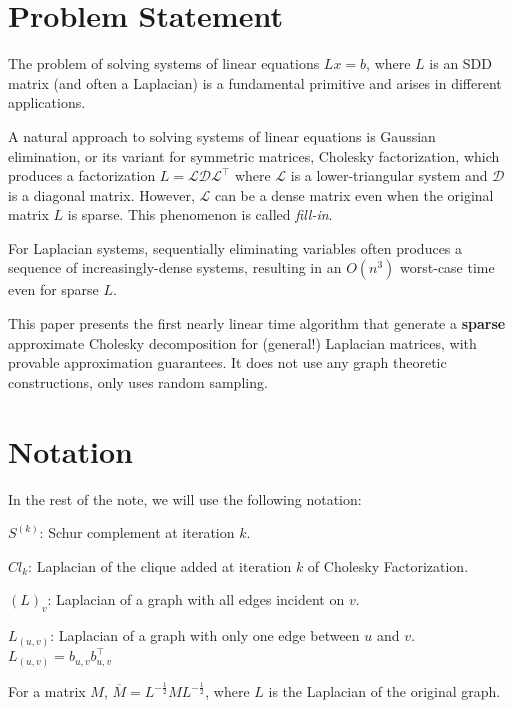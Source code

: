 \documentclass[11pt]{article}
\newenvironment{tight_itemize}{
\begin{itemize}
 \setlength{\itemsep}{2pt}
 \setlength{\parskip}{1pt}
}{\end{itemize}}
\begin{document}
\newcommand{\coursenum}{{CSC 2420}}
\newcommand{\coursename}{Paper Presentation\cite{Kyng16}}
\newcommand{\courseprof}{Sushant Sachdeva}


\section{Problem Statement}

The problem of solving systems of linear equations $Lx = b$, where $L$ is an SDD matrix (and often a Laplacian) is a fundamental primitive 
and arises in different applications. 

A natural approach to solving systems of linear equations is Gaussian elimination, or its variant for symmetric matrices, 
Cholesky factorization, which produces a factorization 
$L = \mathcal{L} \mathcal{D} \mathcal{L}^\top$ where $\mathcal{L}$ is a lower-triangular system 
and $\mathcal{D}$ is a diagonal matrix. However, $\mathcal{L}$ can be a dense matrix even when the original matrix $L$ is sparse. 
This phenomenon is called \textit{fill-in}.

For Laplacian systems, sequentially eliminating variables often produces a sequence of increasingly-dense systems, resulting in an 
$O(n^3)$ worst-case time even for sparse $L$.

This paper\cite{Kyng16} presents the first nearly linear time algorithm that generate a \textbf{sparse} approximate Cholesky decomposition 
for (general!) Laplacian matrices, with provable approximation guarantees. It does not use any graph theoretic constructions, 
only uses random sampling. 


\section{Notation}
In the rest of the note, we will use the following notation:
\begin{tight_itemize}
	\item $ S^{(k)} $: Schur complement at iteration $k$.
	\item $ Cl_{k} $: Laplacian of the clique added at iteration $k$ of Cholesky Factorization.
	\item $ (L)_{v} $: Laplacian of a graph with all edges incident on $v$. 
	\item $ L_{(u,v)}$: Laplacian of a graph with only one edge between $u$ and $v$. $ L_{(u,v)} = b_{u,v}  b_{u,v}^\top $
	\item For a matrix $ M $, $ \overline{M} = L^{-\frac{1}{2}}ML^{-\frac{1}{2} }$, where $ L $ is the Laplacian of the original graph.
\end{tight_itemize}
\end{document}
